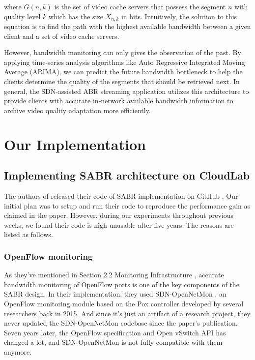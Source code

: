 \documentclass[12pt]{article}
\begin{document}
where $G(n,k)$ is the set of video cache servers that possess the segment $n$ with quality level $k$ which has the size $X_{n,k}$ in bits. Intuitively, the solution to this equation is to find the path with the highest available bandwidth between a given client and a set of video cache servers. 

However, bandwidth monitoring can only gives the observation of the past. By applying time-series analysis algorithms like Auto Regressive Integrated Moving Average (ARIMA), we can predict the future bandwidth bottleneck to help the clients determine the quality of the segments that should be retrieved next. In general, the SDN-assisted ABR streaming application utilizes this architecture to provide clients with accurate in-network available bandwidth information to archive video quality adaptation more efficiently.



\section{Our Implementation}
\subsection{Implementing SABR architecture on CloudLab}

The authors of \cite{bhat_network_2017} released their code of SABR implementation on GitHub \cite{sabr_code}. Our initial plan was to setup and run their code to reproduce the performance gain as claimed in the paper. However, during our experiments throughout previous weeks, we found their code is nigh unusable after five years. The reasons are listed as follows.

\subsubsection{OpenFlow monitoring}
As they've mentioned in Section 2.2 Monitoring Infrastructure \cite{bhat_network_2017}, accurate bandwidth monitoring of OpenFlow ports is one of the key components of the SABR design. In their implementation, they used SDN-OpenNetMon \cite{openmon}, an OpenFlow monitoring module based on the Pox controller developed by several researchers back in 2015. And since it's just an artifact of a research project, they never updated the SDN-OpenNetMon codebase since the paper's publication. Seven years later, the OpenFlow specification and Open vSwitch API has changed a lot, and SDN-OpenNetMon is not fully compatible with them anymore. 
\end{document}
